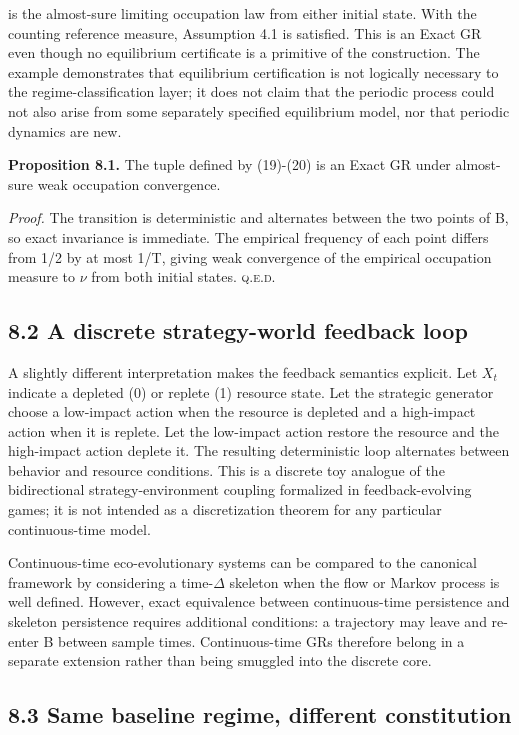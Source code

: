 \documentclass[10pt]{article}
\begin{document}
is the almost-sure limiting occupation law from either initial state.
With the counting reference measure, Assumption 4.1 is satisfied. This
is an Exact GR even though no equilibrium certificate is a primitive of
the construction. The example demonstrates that equilibrium
certification is not logically necessary to the regime-classification
layer; it does not claim that the periodic process could not also arise
from some separately specified equilibrium model, nor that periodic
dynamics are new.

\textbf{Proposition 8.1.} The tuple defined by (19)-(20) is an Exact GR
under almost-sure weak occupation convergence.

\emph{Proof.} The transition is deterministic and alternates between the
two points of B, so exact invariance is immediate. The empirical
frequency of each point differs from 1/2 by at most 1/T, giving weak
convergence of the empirical occupation measure to \(\nu\) from both
initial states. \hfill\textsc{q.e.d.}

\subsection{8.2 A discrete strategy-world feedback
loop}\label{a-discrete-strategy-world-feedback-loop}

A slightly different interpretation makes the feedback semantics
explicit. Let \(X_t\) indicate a depleted (0) or replete (1) resource
state. Let the strategic generator choose a low-impact action when the
resource is depleted and a high-impact action when it is replete. Let
the low-impact action restore the resource and the high-impact action
deplete it. The resulting deterministic loop alternates between behavior
and resource conditions. This is a discrete toy analogue of the
bidirectional strategy-environment coupling formalized in
feedback-evolving games; it is not intended as a discretization theorem
for any particular continuous-time model.

Continuous-time eco-evolutionary systems can be compared to the
canonical framework by considering a time-\(\Delta\) skeleton when the
flow or Markov process is well defined. However, exact equivalence
between continuous-time persistence and skeleton persistence requires
additional conditions: a trajectory may leave and re-enter B between
sample times. Continuous-time GRs therefore belong in a separate
extension rather than being smuggled into the discrete core.

\subsection{8.3 Same baseline regime, different
constitution}\label{same-baseline-regime-different-constitution}
\end{document}
